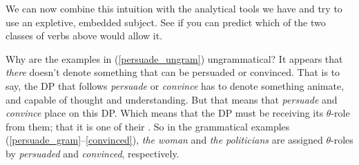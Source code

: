 \documentclass{article}
\begin{document}
We can now combine this intuition with the analytical tools we have and try to use an expletive, embedded subject. See if you can predict which of the two classes of verbs above would allow it.
\begin{exe}
\end{exe}
Why are the examples in (\ref{persuade_ungram}) ungrammatical? 
It appears that \emph{there} doesn't denote something that can be persuaded or convinced.
That is to say, the DP that follows \emph{persuade} or \emph{convince} has to denote something animate, and capable of thought and understanding.
But that means that \emph{persuade} and \emph{convince} place  on this DP.
Which means that the DP must be receiving its $\theta$-role from them; that it is one of their .
So in the grammatical examples (\ref{persuade_gram}--\ref{convinced}), \emph{the woman} and \emph{the politicians} are assigned $\theta$-roles by \emph{persuaded} and \emph{convinced}, respectively.
\end{document}
